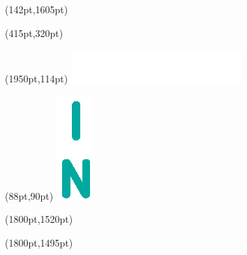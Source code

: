\documentclass[a1,landscape]{a0poster}
\begin{document}

\begin{textblock*}{2100pt}(142pt,1605pt)
	\color{white}{Lorenz Bung \hfill lorenz.bung@htwg-konstanz.de \hfill AIN 4}
\end{textblock*}

\begin{textblock*}{1300pt}(415pt,320pt)
	\Huge{\color{white}{Praxissemester bei isys vision GmbH \& Co. KG}}
\end{textblock*}

\begin{textblock*}{375pt}(1950pt,114pt)
	\includegraphics[scale=4.0]{media/HTWGSchriftzug.eps}
\end{textblock*}

\begin{textblock*}{200pt}(88pt,90pt)
	\includegraphics [scale=2.44]{media/HTWGLogo.eps}
\end{textblock*}

\begin{textblock*}{500pt}(1800pt,1520pt)
	\huge{\color{white}{Angewandte Informatik}}
\end{textblock*}

\begin{textblock*}{200pt}(1800pt,1495pt)
	\color{white}{Studiengang}
\end{textblock*}
\end{document}
